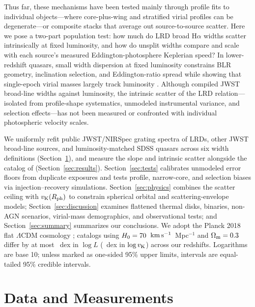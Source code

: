 \documentclass[twocolumn,linenumbers]{aastex701}
\newcommand{\Ha}{H$\alpha$}
\newcommand{\kms}{\ensuremath{{\rm km\,s^{-1}}}}
\newcommand{\Rph}{R_{\rm ph}}
\newcommand{\vK}{v_{\rm K}}
\begin{document}
Thus far, these mechanisms have been tested mainly through profile fits to individual objects---where core-plus-wing and stratified virial profiles can be degenerate---or composite stacks that average out source-to-source scatter.
Here we pose a two-part population test: how much do LRD broad \Ha{} widths scatter intrinsically at fixed luminosity, and how do unsplit widths compare and scale with each source's measured Eddington-photosphere Keplerian speed?
In lower-redshift quasars, small width dispersion at fixed luminosity constrains BLR geometry, inclination selection, and Eddington-ratio spread \citep{Kollmeier2006,Fine2008,Shen2008} while showing that single-epoch virial masses largely track luminosity \citep{Croom2011,Assef2012}.
Although \citet{BaccusXu2026} compiled JWST broad-line widths against luminosity, the intrinsic scatter of the LRD relation---isolated from profile-shape systematics, unmodeled instrumental variance, and selection effects---has not been measured or confronted with individual photospheric velocity scales.

We uniformly refit public JWST/NIRSpec grating spectra of \NLRD{} LRDs, \NOther{} other JWST broad-line sources, and luminosity-matched SDSS quasars across six width definitions (Section~\ref{sec:data}), and measure the slope and intrinsic scatter alongside the catalog of \citet{BaccusXu2026} (Section~\ref{sec:results}).
Section~\ref{sec:tests} calibrates unmodeled error floors from duplicate exposures and tests profile, narrow-core, and selection biases via injection--recovery simulations.
Section~\ref{sec:physics} combines the scatter ceiling with $\vK(\Rph)$ to constrain spherical orbital and scattering-envelope models; Section~\ref{sec:discussion} examines flattened thermal disks, binaries, non-AGN scenarios, virial-mass demographics, and observational tests; and Section~\ref{sec:summary} summarizes our conclusions.
We adopt the Planck 2018 flat $\Lambda$CDM cosmology \citep[$H_0=\Hnot{}$~\kms~Mpc$^{-1}$, $\Omega_{\rm m}=\OmM{}$;][]{Planck2020}; catalogs using $H_0=70{}$~\kms~Mpc$^{-1}$ and $\Omega_{\rm m}=0.3{}$ differ by at most \dCosmoL{}~dex in $\log L$ (\dCosmoVK{}~dex in $\log\vK$) across our redshifts.
Logarithms are base 10; unless marked as one-sided 95\% upper limits, intervals are equal-tailed 95\% credible intervals.

\section{Data and Measurements} \label{sec:data}
\end{document}
